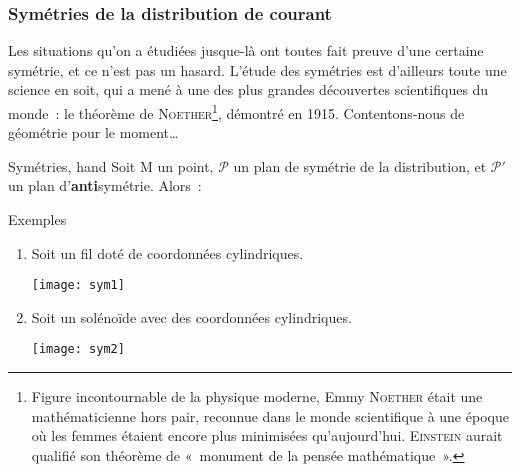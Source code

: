 \documentclass[../main/main.tex]{subfiles}
\begin{document}
\subsubsection{Symétries de la distribution de courant}
\label{sssec:symdist}
Les situations qu'on a étudiées jusque-là ont toutes fait preuve d'une certaine
symétrie, et ce n'est pas un hasard. L'étude des symétries est d'ailleurs toute
une science en soit, qui a mené à une des plus grandes découvertes scientifiques
du monde~: le théorème de \textsc{Noether}\footnote{Figure incontournable de la
	physique moderne, Emmy \textsc{Noether} était une mathématicienne hors pair,
	reconnue dans le monde scientifique à une époque où les femmes étaient encore
	plus minimisées qu'aujourd'hui. \textsc{Einstein} aurait qualifié son théorème
	de «~monument de la pensée mathématique~».}, démontré en 1915. Contentons-nous
de géométrie pour le moment…
\begin{tror}{Symétries, hand}
	Soit M un point, $\mathcal{P}$ un plan de symétrie de la distribution, et
	$\mathcal{P'}$ un plan d'\textbf{anti}symétrie. Alors~:
\end{tror}
\begin{texem}{Exemples}
	\begin{enumerate}
		\item Soit un fil doté de coordonnées cylindriques.
		      \begin{center}
			      \texttt{[image: sym1]}
		      \end{center}
		\item Soit un solénoïde avec des coordonnées cylindriques.
		      \begin{center}
			      \texttt{[image: sym2]}
		      \end{center}
	\end{enumerate}
\end{texem}
\end{document}
